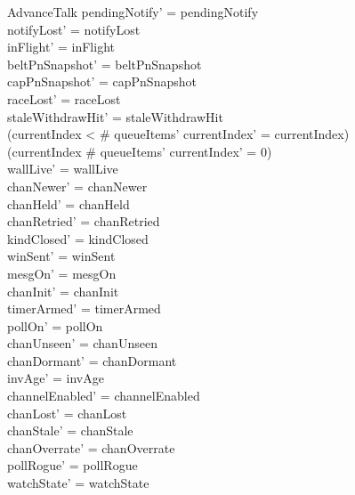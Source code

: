 \documentclass[a4paper,10pt,fleqn]{article}
\begin{document}
\begin{schema}{AdvanceTalk}
  pendingNotify' = pendingNotify \\
  notifyLost' = notifyLost \\
  inFlight' = inFlight \\
  beltPnSnapshot' = beltPnSnapshot \\
  capPnSnapshot' = capPnSnapshot \\
  raceLost' = raceLost \\
  staleWithdrawHit' = staleWithdrawHit \\
  (currentIndex < \# queueItems' \implies currentIndex' = currentIndex) \\
  (currentIndex \geq \# queueItems' \implies currentIndex' = 0) \\
  wallLive' = wallLive \\
  chanNewer' = chanNewer \\
  chanHeld' = chanHeld \\
  chanRetried' = chanRetried \\
  kindClosed' = kindClosed \\
  winSent' = winSent \\
  mesgOn' = mesgOn \\
  chanInit' = chanInit \\
  timerArmed' = timerArmed \\
  pollOn' = pollOn \\
  chanUnseen' = chanUnseen \\
  chanDormant' = chanDormant \\
  invAge' = invAge \\
  channelEnabled' = channelEnabled \\
  chanLost' = chanLost \\
  chanStale' = chanStale \\
  chanOverrate' = chanOverrate \\
  pollRogue' = pollRogue \\
  watchState' = watchState
\end{schema}
\end{document}
